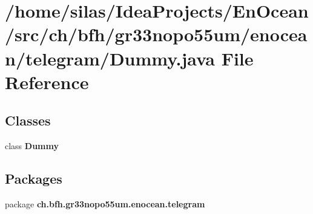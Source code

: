 \section{/home/silas/\+Idea\+Projects/\+En\+Ocean/src/ch/bfh/gr33nopo55um/enocean/telegram/\+Dummy.java File Reference}
\label{Dummy_8java}
\subsection*{Classes}
\begin{DoxyCompactItemize}
\item 
class {\bf Dummy}
\end{DoxyCompactItemize}
\subsection*{Packages}
\begin{DoxyCompactItemize}
\item 
package {\bf ch.\+bfh.\+gr33nopo55um.\+enocean.\+telegram}
\end{DoxyCompactItemize}
